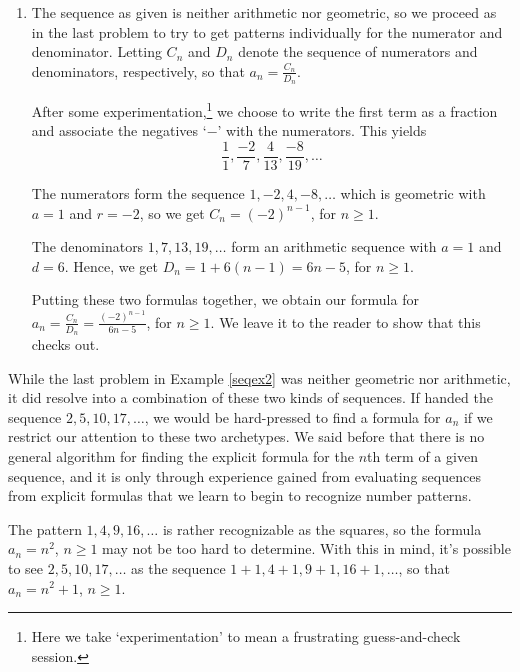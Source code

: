 \documentclass{ximera}
\begin{document}
\begin{example}
\begin{explanation}
\begin{enumerate}
\item  The sequence as given is neither arithmetic nor geometric, so we proceed as in the last problem to try to get patterns individually for the numerator and denominator.  Letting $C_{n}$ and $D_{n}$ denote the sequence of numerators and denominators, respectively,  so that $a_{n} = \frac{C_{n}}{D_{n}}$. 

 After some experimentation,\footnote{Here we take `experimentation' to mean a frustrating guess-and-check session.} we choose to write the first term as a fraction and associate the negatives `$-$' with the numerators.  This yields \[ \frac{1}{1}, \frac{-2}{7}, \frac{4}{13}, \frac{-8}{19}, \ldots \] 
 
 The numerators form the sequence $1, -2, 4, -8, \ldots$ which is geometric with $a=1$ and $r = -2$, so we get $C_{n} = (-2)^{n-1}$, for $n \geq 1$.  
 
 The denominators $1, 7, 13, 19, \ldots$ form an arithmetic sequence with $a = 1$ and $d = 6$.  Hence, we get $D_{n} = 1 + 6(n-1) = 6n-5$, for $n \geq 1$.  
 
 Putting these two formulas together, we obtain our formula for $a_{n} = \frac{C_{n}}{D_{n}} = \frac{(-2)^{n-1}}{6n-5}$, for $n \geq 1$.  We leave it to the reader to show that this checks out. 

\end{enumerate}
\end{explanation}
\end{example}

While the last problem in Example \ref{seqex2} was neither geometric nor arithmetic, it did resolve into a combination of these two kinds of sequences.  If handed the sequence $2, 5, 10, 17, \ldots$, we would be hard-pressed to find a formula for $a_{n}$ if we restrict our attention to these two archetypes.  We said before that there is no general algorithm for finding the explicit formula for the $n$th term of a given sequence, and it is only through experience gained from evaluating sequences from explicit formulas that we learn to begin to recognize number patterns.  

The pattern $1, 4, 9, 16, \ldots$ is rather recognizable as the squares, so the formula $a_{n} = n^2$, $n \geq 1$ may not be too hard to determine.  With this in mind, it's possible to see  $2, 5, 10, 17, \ldots$ as the sequence $1 + 1, 4 + 1, 9 + 1, 16 + 1 , \ldots$, so that $a_{n} = n^2 + 1$, $n \geq 1$.  
\end{document}
